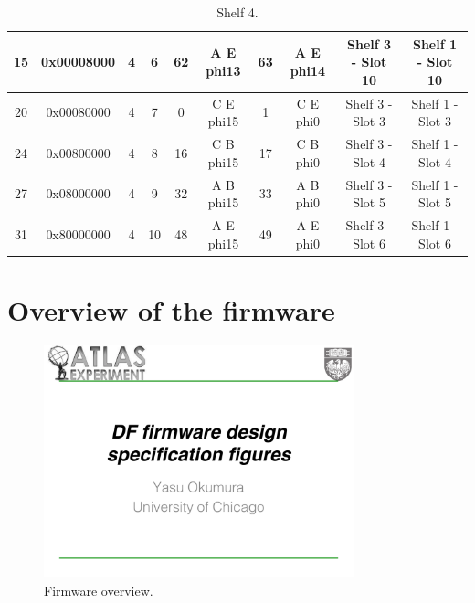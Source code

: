 \documentclass[11pt,letterpaper]{article}
\begin{document}
\begin{table}[h]
\begin{tabular}{|c|c|c|c|c|c|c|c|c|c|}
15                     & 0x00008000            & 4                          & 6                         & 62                            & A E phi13                     & 63                            & A E phi14                     & Shelf 3 - Slot 10       & Shelf 1 - Slot 10       \\ \hline
20                     & 0x00080000            & 4                          & 7                         &  0                            & C E phi15                     &  1                            & C E phi0                      & Shelf 3 - Slot 3        & Shelf 1 - Slot 3        \\ \hline
24                     & 0x00800000            & 4                          & 8                         & 16                            & C B phi15                     & 17                            & C B phi0                      & Shelf 3 - Slot 4        & Shelf 1 - Slot 4        \\ \hline
27                     & 0x08000000            & 4                          & 9                         & 32                            & A B phi15                     & 33                            & A B phi0                      & Shelf 3 - Slot 5        & Shelf 1 - Slot 5        \\ \hline
31                     & 0x80000000            & 4                          & 10                        & 48                            & A E phi15                     & 49                            & A E phi0                      & Shelf 3 - Slot 6        & Shelf 1 - Slot 6        \\ \hline
\end{tabular}
\caption{Shelf 4.}
\label{tab:shelf4}
\end{table}

\clearpage

\section{Overview of the firmware}

\begin{figure}[h!]
  \centering
  \includegraphics[width=0.80\textwidth,clip,page=3]{figures.pdf}
  \caption{Firmware overview.}
  \label{fig:OVERVIEW}
\end{figure}
\end{document}
